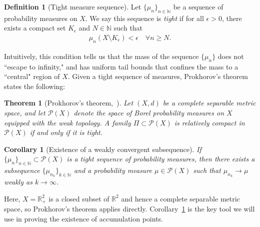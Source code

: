 \documentclass[a4paper,11pt]{article}
\theoremstyle{plain}
\newtheorem{thm}{Theorem}[section]
\newtheorem{cor}{Corollary}
\theoremstyle{definition}
\newtheorem{defn}{Definition}[section]
\theoremstyle{remark}
\newcommand{\ba}{\begin{equation} \begin{aligned}}
\newcommand{\ea}{\end{aligned} \end{equation}}
\begin{document}
\begin{defn}[Tight measure sequence]
\label{deftightness}
Let $\{\mu_n\}_{n \in \mathbb{N}}$ be a sequence of probability measures on $X$. We say this sequence is \textit{tight} if for all $\epsilon>0$, there exists a compact set $K_\epsilon$ and $N\in\mathbb{N}$ such that
\ba
\mu_n(X\setminus K_\epsilon) <\epsilon \quad \forall n \geq N.
\ea
\end{defn}
\noindent Intuitively, this condition tells us that the mass of the sequence $\{\mu_n\}$ does not ``escape to infinity," and has uniform tail bounds that confines the mass to a ``central" region of $X$. Given a tight sequence of measures, Prokhorov's theorem states the following:

\begin{thm}[Prokhorov's theorem,~\cite{Billingsley1999,Prokhorov1956}]
\label{thm:prokhorov}
Let $(X,d)$ be a complete separable metric space, and let $\mathcal{P}(X)$ denote the space of Borel probability measures on $X$ equipped with the weak topology. A family $\Pi \subset \mathcal{P}(X)$ is relatively compact in $\mathcal{P}(X)$ if and only if it is tight.
\end{thm}
\begin{cor}[Existence of a weakly convergent subsequence]
\label{cor:prokhorov}
If $\{\mu_n\}_{n \in \mathbb{N}} \subset \mathcal{P}(X)$ is a tight sequence of probability measures, then there exists a subsequence $\{\mu_{n_k}\}_{k \in \mathbb{N}}$ and a probability measure $\mu \in \mathcal{P}(X)$ such that $\mu_{n_k} \to \mu$ weakly as $k \to \infty$.
\end{cor}

\noindent Here, $X = \mathbb{R}^2_+$ is a closed subset of $\mathbb{R}^2$ and hence a complete separable metric space, so Prokhorov's theorem applies directly. Corollary~\ref{cor:prokhorov} is the key tool we will use in proving the existence of accumulation points.
\end{document}
